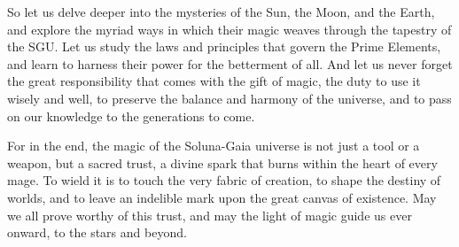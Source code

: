 \documentclass[12pt]{article}
\begin{document}
So let us delve deeper into the mysteries of the Sun, the Moon, and the Earth, and explore the myriad ways in which their magic weaves through the tapestry of the SGU. Let us study the laws and principles that govern the Prime Elements, and learn to harness their power for the betterment of all. And let us never forget the great responsibility that comes with the gift of magic, the duty to use it wisely and well, to preserve the balance and harmony of the universe, and to pass on our knowledge to the generations to come.

For in the end, the magic of the Soluna-Gaia universe is not just a tool or a weapon, but a sacred trust, a divine spark that burns within the heart of every mage. To wield it is to touch the very fabric of creation, to shape the destiny of worlds, and to leave an indelible mark upon the great canvas of existence. May we all prove worthy of this trust, and may the light of magic guide us ever onward, to the stars and beyond.
%     
%     
\end{document}
